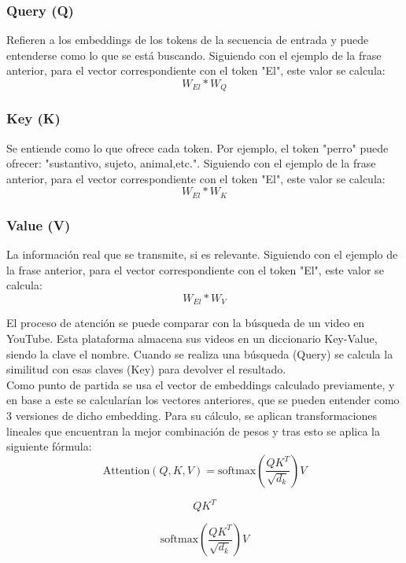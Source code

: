 \documentclass[11pt]{book}
\theoremstyle{plain}
\theoremstyle{definition}
\begin{document}
\subsubsection{Query (Q)}
Refieren a los embeddings de los tokens de la secuencia de entrada y puede entenderse como lo que se está buscando. Siguiendo con el ejemplo de la frase anterior, para el vector correspondiente con el token "El", este valor se calcula: \[W_{El} * W_{Q}\]

\subsubsection{Key (K)}
Se entiende como lo que ofrece cada token. Por ejemplo, el token "perro" puede ofrecer: "sustantivo, sujeto, animal,etc.". Siguiendo con el ejemplo de la frase anterior, para el vector correspondiente con el token "El", este valor se calcula: \[W_{El} * W_{K}\]

\subsubsection{Value (V)}
La información real que se transmite, si es relevante. Siguiendo con el ejemplo de la frase anterior, para el vector correspondiente con el token "El", este valor se calcula: \[W_{El} * W_{V}\]

El proceso de atención se puede comparar con la búsqueda de un video en YouTube. Esta plataforma almacena sus videos en un diccionario Key-Value, siendo la clave el nombre. Cuando se realiza una búsqueda (Query) se calcula la similitud con esas claves (Key) para devolver el resultado. \\
Como punto de partida se usa el vector de embeddings calculado previamente, y en base a este se calcularían los vectores anteriores, que se pueden entender como 3 versiones de dicho embedding. Para su cálculo, se aplican transformaciones lineales que encuentran la mejor combinación de pesos y tras esto se aplica la siguiente fórmula:
\[
\text{Attention}(Q, K, V) = \text{softmax}\!\left(\frac{QK^{T}}{\sqrt{d_k}}\right)V
\]

\[
QK^{T}
\]
\noindent{}

\[
\mathrm{softmax}\!\left(\frac{QK^{T}}{\sqrt{d_k}}\right)V
\]
\noindent{}
\end{document}
